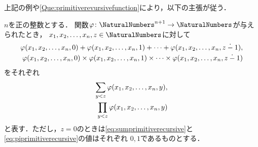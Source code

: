 
上記の例や\cref{Que:primitiverevursivefunction}により，以下の主張が従う．


\begin{Def} \label{Def:pisumprimitiverecursive}
	\(n\)を正の整数とする．
	関数\(\varphi \colon \NaturalNumbers^{n+1} \to \NaturalNumbers\)が与えられたとき，
	\(x_1, x_2, \dots, x_n, z \in \NaturalNumbers\)に対して
	\begin{align*}
		\apply{\varphi}{x_1, x_2, \dots, x_n, 0}
		+ \apply{\varphi}{x_1, x_2, \dots, x_n, 1}
		+ \dots
		+ \apply{\varphi}{x_1, x_2, \dots, x_n, z \entireminus 1}, \\
		\apply{\varphi}{x_1, x_2, \dots, x_n, 0}
		\times \apply{\varphi}{x_1, x_2, \dots, x_n, 1}
		\times \dots
		\times \apply{\varphi}{x_1, x_2, \dots, x_n, z \entireminus 1}
	\end{align*}
	をそれぞれ
	\begin{align}
		\sum_{y < z} \apply{\varphi}{x_1, x_2, \dots, x_n, y},
		\label{eq:sumprimitiverecursive} \\
		\prod_{y < z} \apply{\varphi}{x_1, x_2, \dots, x_n, y}
		\label{eq:piprimitiverecursive}
	\end{align}
	と表す．ただし，\(z = 0\)のときは\cref{eq:sumprimitiverecursive}と\cref{eq:piprimitiverecursive}の値はそれぞれ
	\(0, 1\)であるものとする．
\end{Def}

